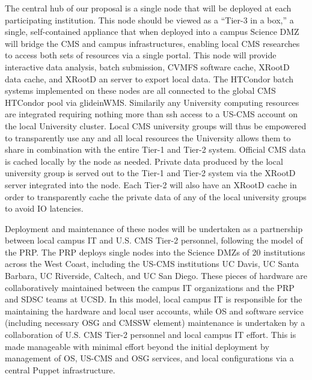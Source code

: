 \documentclass[11pt,a4paper]{article}
\begin{document}
The central hub of our proposal is a single node that will be deployed at each participating institution.  This node should be viewed as a ``Tier-3 in a box,'' a single, self-contained appliance that when deployed into a campus Science DMZ will bridge the CMS and campus infrastructures, enabling local CMS researches to access both sets of resources via a single portal.  This node will provide interactive data analysis, batch submission, CVMFS software cache, XRootD data cache, and XRootD an server to export local data.  The HTCondor batch systems implemented on these nodes are all connected to the global CMS HTCondor pool via glideinWMS.  Similarily any University computing resources are integrated requiring nothing more than ssh access to a US-CMS account on the local University cluster.  Local CMS university groups will thus be empowered to transparently use any and all local resources the University allows them to share in combination with the entire Tier-1 and Tier-2 system. Official CMS data is cached locally by the node as needed.  Private data produced by the local university group is served out to the Tier-1 and Tier-2 system via the XRootD server integrated into the node.  Each Tier-2 will also have an XRootD cache in order to transparently cache the private data of any of the local university groups to avoid IO latencies. 

Deployment and maintenance of these nodes will be undertaken as a partnership between local campus IT and U.S. CMS Tier-2 personnel, following the model of the PRP.  The PRP deploys single nodes into the Science DMZs of 20 institutions across the West Coast, including the US-CMS institutions UC Davis, UC Santa Barbara, UC Riverside, Caltech, and UC San Diego. These pieces of hardware are collaboratively maintained between the campus IT organizations and the PRP and SDSC teams at UCSD.  In this model, local campus IT is responsible for the maintaining the hardware and local user accounts, while OS and software service (including necessary OSG and CMSSW element) maintenance is undertaken by a collaboration of U.S. CMS Tier-2 personnel and local campus IT effort.  This is made manageable with minimal effort beyond the initial deployment by management of OS, US-CMS and OSG services, and local configurations via a central Puppet infrastructure.
\end{document}
